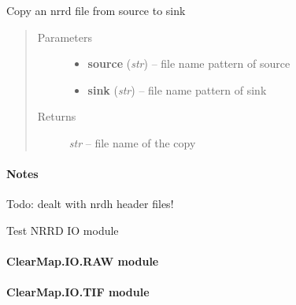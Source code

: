 \documentclass[letterpaper,10pt,english]{sphinxmanual}
\begin{document}

\begin{fulllineitems}
\label{api/ClearMap.IO:ClearMap.IO.NRRD.copyData}
Copy an nrrd file from source to sink
\begin{quote}\begin{description}
\item[{Parameters}] \leavevmode\begin{itemize}
\item {} 
\textbf{source} (\emph{str}) --
file name pattern of source

\item {} 
\textbf{sink} (\emph{str}) --
file name pattern of sink

\end{itemize}

\item[{Returns}] \leavevmode
\emph{str} --
file name of the copy

\end{description}\end{quote}
\paragraph{Notes}

Todo: dealt with nrdh header files!

\end{fulllineitems}


\begin{fulllineitems}
\label{api/ClearMap.IO:ClearMap.IO.NRRD.test}
Test NRRD IO module

\end{fulllineitems}



\paragraph{ClearMap.IO.RAW module}
\label{api/ClearMap.IO:clearmap-io-raw-module}

\paragraph{ClearMap.IO.TIF module}
\label{api/ClearMap.IO:clearmap-io-tif-module}
\end{document}
